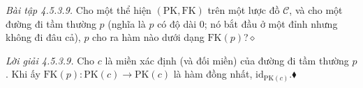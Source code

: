 \noindent\textit{Bài tập 4.5.3.9.}\keepwithnext
Cho một thể hiện $(\mathrm{PK},\mathrm{FK})$ trên một lược đồ $\mathcal C$, và cho một đường đi tầm thường $p$ (nghĩa là $p$ có độ dài $0$; nó bắt đầu ở một đỉnh nhưng không đi đâu cả), $p$ cho ra hàm nào dưới dạng $\mathrm{FK}(p)$?\nobreak\hfill$\diamond$

\noindent\textit{Lời giải 4.5.3.9.}\keepwithnext
Cho $c$ là miền xác định (và đối miền) của đường đi tầm thường $p$. Khi ấy $\mathrm{FK}(p):\mathrm{PK}(c)\to\mathrm{PK}(c)$ là hàm đồng nhất, $\mathrm{id}_{\mathrm{PK}(c)}$.\nobreak\hfill$\blacklozenge$

